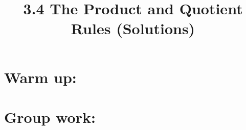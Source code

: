 \documentclass[nooutcomes]{ximera}
\title{3.4 The Product and Quotient Rules (Solutions)}
\begin{document}
\begin{abstract}		\end{abstract}
\maketitle

\section*{Warm up:} 
	
	\begin{freeResponse}
	\end{freeResponse}	
	
	
	
	
	

\section*{Group work:}

\begin{problem}

			\begin{freeResponse}
			
			\end{freeResponse}
\end{problem}
	
	
	
	
			
			

\begin{problem}

		\begin{freeResponse}

		\end{freeResponse}
		
\end{problem}









\begin{problem}

		\begin{freeResponse}
		
		\end{freeResponse}
		
\end{problem}







\begin{problem}

		\begin{freeResponse}
		\end{freeResponse}
		



\end{problem}
	
	
	
	
	
	
	
	
	

	










								
				
				
	
\end{document}
